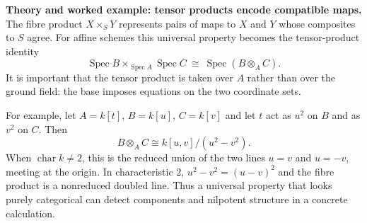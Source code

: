 \noindent\textbf{Theory and worked example: tensor products encode compatible maps.}
The fibre product $X\times_S Y$ represents pairs of maps to $X$ and $Y$
whose composites to $S$ agree. For affine schemes this universal property
becomes the tensor-product identity
\[
\operatorname{Spec}B\times_{\operatorname{Spec}A}
\operatorname{Spec}C\ \cong\ \operatorname{Spec}(B\otimes_A C).
\]
It is important that the tensor product is taken over $A$ rather than over
the ground field: the base imposes equations on the two coordinate sets.

For example, let $A=k[t]$, $B=k[u]$, $C=k[v]$ and let $t$ act as $u^2$
on $B$ and as $v^2$ on $C$. Then
\[
B\otimes_A C\cong k[u,v]/(u^2-v^2).
\]
When $\operatorname{char}k\ne2$, this is the reduced union of the two
lines $u=v$ and $u=-v$, meeting at the origin. In characteristic $2$,
$u^2-v^2=(u-v)^2$ and the fibre product is a nonreduced doubled line.
Thus a universal property that looks purely categorical can detect
components and nilpotent structure in a concrete calculation.

\medskip
